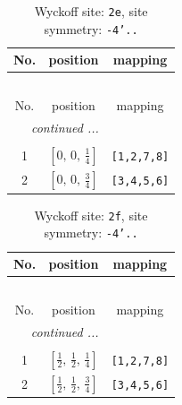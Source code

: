 \documentclass[fleqn,8pt]{jsarticle}
\begin{document}
\begin{longtable}{ccc}
\caption{Wyckoff site: {\tt 2e}, site symmetry: {\tt -4'..}}
 \\
 \hline \hline
No. & position & mapping \\ \hline \endfirsthead

\multicolumn{2}{l}{\tablename\ \thetable{}} \\
 \hline \hline
No. & position & mapping \\ \hline \endhead

 \hline \hline
\multicolumn{2}{r}{\footnotesize\it continued ...} \\ \endfoot

 \hline \hline
\multicolumn{2}{r}{} \\ \endlastfoot

1 & $\left[ 0,\, 0,\, \frac{1}{4} \right]$ & {\tt [1,2,7,8]} \\ \hline
2 & $\left[ 0,\, 0,\, \frac{3}{4} \right]$ & {\tt [3,4,5,6]} \\
\end{longtable}
\renewcommand{\arraystretch}{1.2}
\begin{longtable}{ccc}
\caption{Wyckoff site: {\tt 2f}, site symmetry: {\tt -4'..}}
 \\
 \hline \hline
No. & position & mapping \\ \hline \endfirsthead

\multicolumn{2}{l}{\tablename\ \thetable{}} \\
 \hline \hline
No. & position & mapping \\ \hline \endhead

 \hline \hline
\multicolumn{2}{r}{\footnotesize\it continued ...} \\ \endfoot

 \hline \hline
\multicolumn{2}{r}{} \\ \endlastfoot

1 & $\left[ \frac{1}{2},\, \frac{1}{2},\, \frac{1}{4} \right]$ & {\tt [1,2,7,8]} \\ \hline
2 & $\left[ \frac{1}{2},\, \frac{1}{2},\, \frac{3}{4} \right]$ & {\tt [3,4,5,6]} \\
\end{longtable}
\renewcommand{\arraystretch}{1.2}
\end{document}
